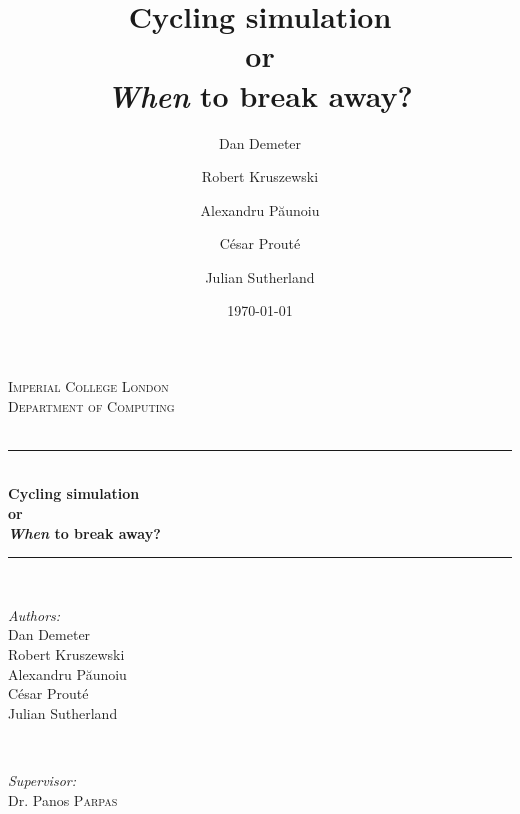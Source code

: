 \documentclass[10pt, a4paper]{report}
\title{Cycling simulation\\or\\\textit{When} to break away?}
\date{\today}
\author{Dan Demeter\and Robert Kruszewski\and Alexandru P\u{a}unoiu \and C\'esar Prout\'e \and Julian Sutherland}
\begin{document}
\begin{titlepage}

\newcommand{\HRule}{\rule{\linewidth}{0.5mm}} %

\center %


\textsc{\LARGE Imperial College London}\\[1.5cm] %
\textsc{\Large Department of Computing}\\[0.5cm] %
\textsc{\large}\\[0.5cm] %


\HRule \\[0.4cm]
{ \huge \bfseries Cycling simulation\\or\\\vspace{0.4cm}\textit{When} to break away?}\\[0.4cm] %
\HRule \\[1.5cm]


\begin{minipage}{0.4\textwidth}
\begin{flushleft} \large
\emph{Authors:}\\
Dan Demeter \\
Robert Kruszewski\\
Alexandru P\u{a}unoiu\\
C\'esar Prout\'e\\
Julian Sutherland
\end{flushleft}
\end{minipage}
~
\begin{minipage}{0.4\textwidth}
\begin{flushright} \large
\emph{Supervisor:} \\
Dr. Panos \textsc{Parpas} %
\end{flushright}
\end{minipage}\\[5cm]


\end{titlepage}
\end{document}
